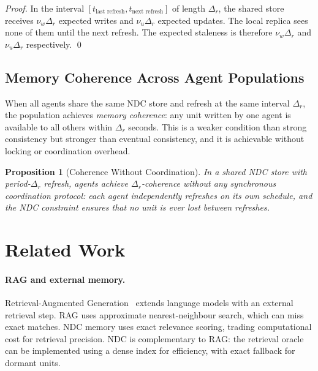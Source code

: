 \documentclass[12pt]{article}
\newtheorem{proposition}[theorem]{Proposition}
\begin{document}
\begin{proof}
  In the interval $[t_\text{last refresh}, t_\text{next refresh}]$ of length
  $\Delta_r$, the shared store receives $\nu_w \Delta_r$ expected writes and
  $\nu_u \Delta_r$ expected updates.  The local replica sees none of them
  until the next refresh.  The expected staleness is therefore
  $\nu_w \Delta_r$ and $\nu_u \Delta_r$ respectively. \qed
\end{proof}

\subsection{Memory Coherence Across Agent Populations}

When all agents share the same NDC store and refresh at the same interval
$\Delta_r$, the population achieves \emph{memory coherence}: any unit written
by one agent is available to all others within $\Delta_r$ seconds.  This is
a weaker condition than strong consistency but stronger than eventual
consistency, and it is achievable without locking or coordination overhead.

\begin{proposition}[Coherence Without Coordination]
  In a shared NDC store with period-$\Delta_r$ refresh, agents achieve
  $\Delta_r$-coherence without any synchronous coordination protocol: each
  agent independently refreshes on its own schedule, and the NDC constraint
  ensures that no unit is ever lost between refreshes.
\end{proposition}

\section{Related Work}
\label{sec:related}

\paragraph{RAG and external memory.}
Retrieval-Augmented Generation~\cite{lewis2020} extends language models with
an external retrieval step.  RAG uses approximate nearest-neighbour search,
which can miss exact matches.  NDC memory uses exact relevance scoring, trading
computational cost for retrieval precision.  NDC is complementary to RAG: the
retrieval oracle can be implemented using a dense index for efficiency, with
exact fallback for dormant units.
\end{document}
